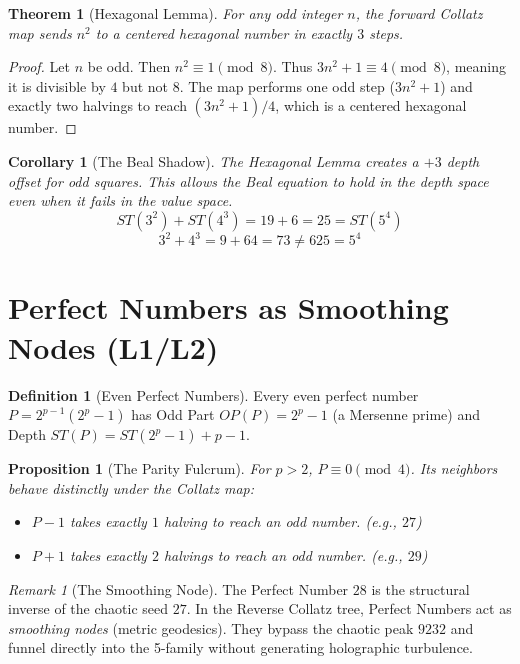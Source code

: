 \documentclass[11pt]{article}
\newtheorem{theorem}{Theorem}
\newtheorem{proposition}{Proposition}
\newtheorem{corollary}{Corollary}
\theoremstyle{definition}
\newtheorem{definition}{Definition}
\theoremstyle{remark}
\newtheorem{remark}{Remark}
\begin{document}
\begin{theorem}[Hexagonal Lemma]
For any odd integer \(n\), the forward Collatz map sends \(n^2\) to a centered hexagonal number in exactly \(3\) steps.
\end{theorem}

\begin{proof}
Let \(n\) be odd. Then \(n^2 \equiv 1 \pmod 8\). Thus \(3n^2+1 \equiv 4 \pmod 8\), meaning it is divisible by \(4\) but not \(8\). The map performs one odd step (\(3n^2+1\)) and exactly two halvings to reach \((3n^2+1)/4\), which is a centered hexagonal number.
\end{proof}

\begin{corollary}[The Beal Shadow]
The Hexagonal Lemma creates a \(+3\) depth offset for odd squares. This allows the Beal equation to hold in the depth space even when it fails in the value space.
\[ ST(3^2) + ST(4^3) = 19 + 6 = 25 = ST(5^4) \]
\[ 3^2 + 4^3 = 9 + 64 = 73 \neq 625 = 5^4 \]
\end{corollary}

\section{Perfect Numbers as Smoothing Nodes (L1/L2)}

\begin{definition}[Even Perfect Numbers]
Every even perfect number \(P = 2^{p-1}(2^p-1)\) has Odd Part \(OP(P) = 2^p-1\) (a Mersenne prime) and Depth \(ST(P) = ST(2^p-1) + p-1\).
\end{definition}

\begin{proposition}[The Parity Fulcrum]
For \(p > 2\), \(P \equiv 0 \pmod 4\). Its neighbors behave distinctly under the Collatz map:
\begin{itemize}
    \item \(P-1\) takes exactly \(1\) halving to reach an odd number. (e.g., \(27\))
    \item \(P+1\) takes exactly \(2\) halvings to reach an odd number. (e.g., \(29\))
\end{itemize}
\end{proposition}

\begin{remark}[The Smoothing Node]
The Perfect Number \(28\) is the structural inverse of the chaotic seed \(27\). In the Reverse Collatz tree, Perfect Numbers act as \emph{smoothing nodes} (metric geodesics). They bypass the chaotic peak \(9232\) and funnel directly into the 5-family without generating holographic turbulence.
\end{remark}
\end{document}
